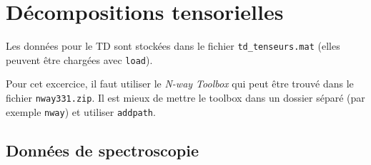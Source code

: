 \chapter{Décompositions tensorielles}

Les données pour le TD sont stockées dans le fichier \lstinline{td_tenseurs.mat} (elles peuvent être chargées avec \lstinline{load}).



Pour cet excercice, il faut utiliser le \emph{N-way Toolbox} qui peut être trouvé dans le fichier {\tt nway331.zip}.
Il est mieux de mettre le toolbox dans un dossier séparé (par exemple {\tt nway}) et utiliser {\tt addpath}. 

\section{Données de spectroscopie}

